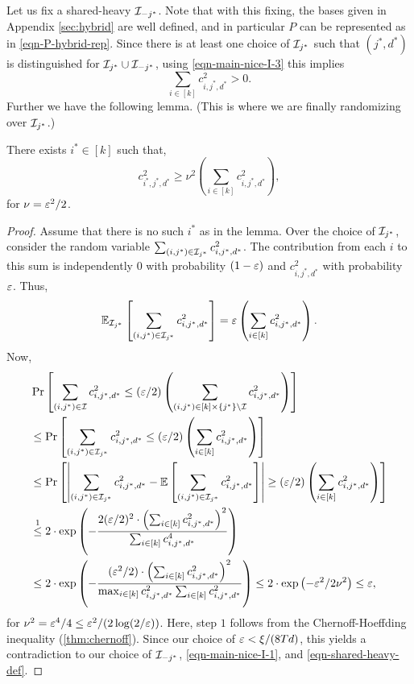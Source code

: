 Let us fix a shared-heavy $\mathcal{I}_{-j^*}$. Note that with this fixing,
the bases given in Appendix \ref{sec:hybrid} are well defined, and in
particular $P$ can be represented as in
\eqref{eqn-P-hybrid-rep}. Since there is at least one choice of
$\mathcal{I}_{j^*}$ such that $(j^*, d^*)$ is distinguished for
$\mathcal{I}_{j^*}\cup \mathcal{I}_{-j^*}$, using \eqref{eqn-main-nice-I-3} this implies
\begin{equation}
\sum_{i \in
[k]} c_{i,j^*,d^*}^2 > 0. \label{eqn-main-shared-heavy-I-3}
\end{equation}
Further we have the following lemma. (This is where we are finally randomizing over $\mathcal{I}_{j^*}$.)
\begin{lemma}\label{lem:Azuma-apply}
There exists $i^* \in [k]$ such that,
$$c_{i^*,j^*,d^*}^2 \geq \nu^2 
\left(\sum_{i \in [k]} c_{i,j^*,d^*}^2\right),$$
for $\nu = \varepsilon^2/2$. 
\end{lemma}
\begin{proof}
Assume that there is no such $i^*$ as in the lemma.
Over the choice of ${\mathcal{I}_{j^*}}$, consider the random variable 
$\sum_{(i,j^*) \in \mathcal{I}_{j^*}} c_{i,j^*,d^*}^2$. The
contribution from each $i$ to this sum is independently $0$ with
probability $(1- \varepsilon)$ and
$c_{i,j^*,d^*}^2$ with probability $\varepsilon$.
Thus,
$$\mathbb{E}_{\mathcal{I}_{j^*}}\left[\sum_{(i,j^*) \in \mathcal{I}_{j^*}}
c_{i,j^*,d^*}^2\right] = \varepsilon\left(\sum_{i \in [k]}
c_{i,j^*,d^*}^2\right).$$
Now,
{\allowdisplaybreaks
\begin{align*}
&\Pr\left[\sum_{(i,j^*) \in \mathcal{I}}
c_{i,j^*,d^*}^2 \leq (\varepsilon/2)\left(\sum_{(i,j^*) \in
[k]\times\{j^*\}\setminus \mathcal{I}}
c_{i,j^*,d^*}^2\right) \right] \nonumber \\
&\leq \Pr\left[\sum_{(i,j^*) \in \mathcal{I}_{j^*}}
c_{i,j^*,d^*}^2 \leq (\varepsilon/2)\left(\sum_{i \in [k]}
c_{i,j^*,d^*}^2\right) \right] \nonumber \\
&\leq  
\Pr\left[\left|\sum_{(i,j^*) \in \mathcal{I}_{j^*}}
c_{i,j^*,d^*}^2 - \mathbb{E}\left[\sum_{(i,j^*) \in \mathcal{I}_{j^*}}
c_{i,j^*,d^*}^2\right]\right| \geq (\varepsilon/2)\left(\sum_{i \in [k]}
c_{i,j^*,d^*}^2\right) \right]\\
&\overset{1}{\leq} 2\cdot\textnormal{exp}\left(-\frac{2(\varepsilon/2)^2\cdot \left(\sum_{i \in [k]}
c_{i,j^*,d^*}^2\right)^2}{\sum_{i\in[k]} c_{i,j^*,d^*}^4}\right)
\nonumber \\
&\leq  2\cdot \textnormal{exp}\left(-\frac{(\varepsilon^2/2) \cdot \left(\sum_{i \in [k]}
c_{i,j^*,d^*}^2\right)^2}{\max_{i\in[k]} c_{i,j^*,d^*}^2
\sum_{i\in[k]} c_{i,j^*,d^*}^2}\right)
 \leq   2\cdot \textnormal{exp}\left(-\varepsilon^2/2\nu^2\right) \leq  \varepsilon,
\end{align*}}
for $\nu^2 = \varepsilon^4/4 \leq \varepsilon^2/(2\log(2/\varepsilon))$. Here, step $1$ follows from the Chernoff-Hoeffding inequality (\cref{thm:chernoff}). Since our choice of $\varepsilon <
\xi/(8Td)$, this yields a contradiction
to our choice of $\mathcal{I}_{-j^*}$,  \eqref{eqn-main-nice-I-1},
and  \eqref{eqn-shared-heavy-def}.

\end{proof}



